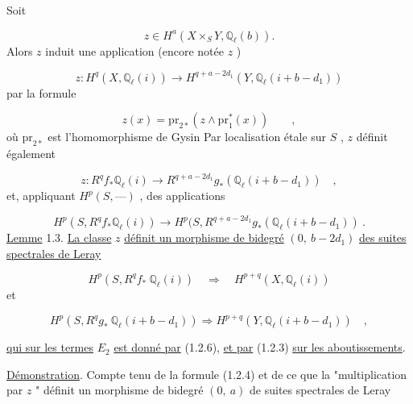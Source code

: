 Soit

\begin{equation}\tag{1.2.2}
z \in H^a(X \times_S Y, \mathbb{Q}_\ell(b)).
\end{equation}
Alors $z$ induit une application (encore notée $z$ )

\begin{equation}\tag{1.2.3}
z : H^q(X, \mathbb{Q}_\ell(i)) \longrightarrow H^{q+a-2d_1} (Y, \mathbb{Q}_\ell(i+b-d_1))
\end{equation}
par la formule

\begin{equation}\tag{1.2.4}
z(x) = \mathrm{pr}_{2*}(z \wedge \mathrm{pr}_1^* (x)) \qquad ,
\end{equation}
où $\mathrm{pr}_{2*}$ est l'homomorphisme de Gysin  Par localisation étale sur $S$ , $z$ définit également

\begin{equation}\tag{1.2.5}
z : R^q f_* \mathbb{Q}_\ell(i) \longrightarrow R^{q+a-2d_1} g_* (\mathbb{Q}_\ell(i+b-d_1)) \quad ,
\end{equation}
et, appliquant $H^p(S, \text{---} )$ , des applications

\begin{equation}\tag{1.2.6}
H^p(S, R^q f_* \mathbb{Q}_\ell(i)) \longrightarrow H^p(S, R^{q+a-2d_1} g_*(\mathbb{Q}_\ell(i+b-d_1)) \ .
\end{equation}
\underline{Lemme} 1.3.  \underline{La classe}  $z$  \underline{définit un morphisme de bidegré} $(0,\ b-2d_1)$ \underline{des suites spectrales de Leray}

\begin{equation}\tag{1.2.7}
H^p(S, R^q f_* \ \mathbb{Q}_\ell(i)) \quad \Rightarrow \quad H^{p+q}(X, \mathbb{Q}_\ell(i))
\end{equation}
et

\begin{equation}\tag{1.2.8}
H^p(S, R^q g_* \ \mathbb{Q}_\ell(i+b-d_1)) \Rightarrow H^{p+q}(Y, \mathbb{Q}_\ell(i+b-d_1)) \quad , 
\end{equation}


 \underline{qui sur les termes} $E_2$ \underline{est donné par} (1.2.6), \underline{et par} (1.2.3) \underline{sur les aboutissements}.

\underline{Démonstration}. Compte tenu de la formule (1.2.4) et de ce que la "multiplication par $z$ " définit un morphisme de bidegré $(0,\ a)$ de suites spectrales de Leray

